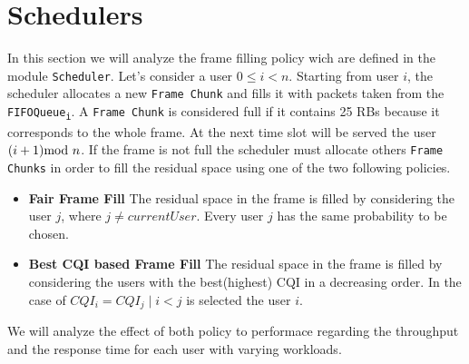 \section{Schedulers}
  In this section we will analyze the frame filling policy wich are defined in the module \texttt{Scheduler}.
  Let's consider a user \(0\leq i < n\). Starting from user \(i\), the scheduler allocates a new \texttt{Frame Chunk} and fills it with packets taken from the \texttt{FIFOQueue\textsubscript{i}}. A \texttt{Frame Chunk} is considered full if it contains 25 RBs because it corresponds to the whole frame. At the next time slot will be served the user \((i+1)\textnormal{mod }n\). If the frame is not full the scheduler must allocate others \texttt{Frame Chunks} in order to fill the residual space using one of the two following policies. 

\begin{itemize}
  \item \textbf{Fair Frame Fill}
  The residual space in the frame is filled by considering the user \(j\), where \(j \neq currentUser\). Every user \(j\) has the same probability to be chosen.
  \item \textbf{Best CQI based Frame Fill}
   The residual space in the frame is filled by considering the users with the best(highest) CQI in a decreasing order. In the case of \(CQI_i=CQI_j \mid i < j\) is selected the user \(i\).
\end{itemize}
We will analyze the effect of both policy to performace regarding the throughput and the response time for each user with varying workloads.

